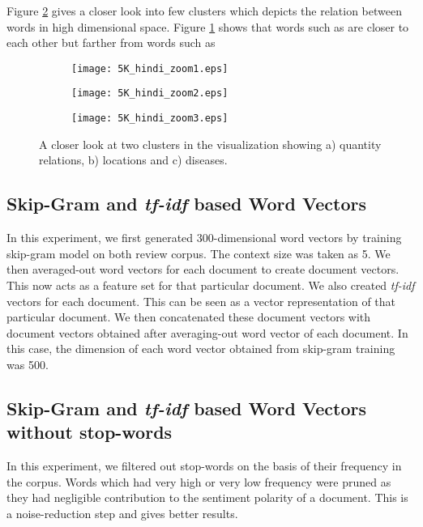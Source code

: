 Figure \ref{fig:5K_hindi_zoom} gives a closer look into few clusters which depicts the relation between words in high dimensional space. Figure \ref{fig:5K_hindi_zoom1} shows that words such as 
are closer to each other but farther from words such as 

\begin{figure}[ht!]
    \centering
    \begin{subfigure}{.4\linewidth}
        \texttt{[image: 5K\_hindi\_zoom1.eps]}
        \caption{}
        \label{fig:5K_hindi_zoom1}
    \end{subfigure}
    \newline
    \begin{subfigure}{.4\linewidth}
        \texttt{[image: 5K\_hindi\_zoom2.eps]}
        \caption{}
    \end{subfigure}
    \newline
    \begin{subfigure}{.4\linewidth}
        \texttt{[image: 5K\_hindi\_zoom3.eps]}
        \caption{}
    \end{subfigure}
    \caption{A closer look at two clusters in the visualization showing a) quantity relations, b) locations and c) diseases.}
    \label{fig:5K_hindi_zoom}
\end{figure}

\subsection{Skip-Gram and \emph{tf-idf} based Word Vectors}
In this experiment, we first generated 300-dimensional word vectors by training skip-gram model on both review corpus. The context size was taken as 5. We then averaged-out word vectors for each document to create document vectors. This now acts as a feature set for that particular document.
We also created \emph{tf-idf} vectors for each document. This can be seen as a vector representation of that particular document. We then concatenated these document vectors with document vectors obtained after averaging-out word vector of each document. In this case, the dimension of each word vector obtained from skip-gram training was 500.

\subsection{Skip-Gram and \emph{tf-idf} based Word Vectors without stop-words}
In this experiment, we filtered out stop-words on the basis of their frequency in the corpus. Words which had very high or very low frequency were pruned as they had negligible contribution to the sentiment polarity of a document. This is a noise-reduction step and gives better results.
